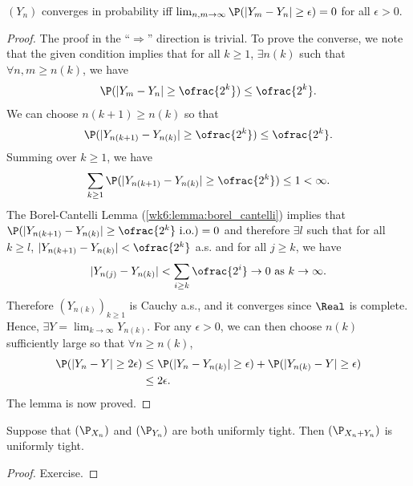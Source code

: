 \documentclass[../aipt.tex]{subfiles}
\begin{document}
\begin{Lemma}\label{wk11:lem:Yconvpiff}
$(Y_n)$ converges in probability iff $\lim_{n,m\to\infty} \P(|Y_m-Y_n|\geq \epsilon) =0$ for all $\epsilon>0$.
\end{Lemma}
\begin{proof}
The proof in the ``$\Rightarrow$'' direction is trivial. To prove the converse, we note that the given condition implies that for all $k\geq1$, $\exists n(k)$ such that $\forall n,m \geq n(k)$, we have
\begin{align*}
\P(|Y_m-Y_n|\geq\ofrac{2^k}) \leq \ofrac{2^k}. 
\end{align*}
We can choose $n(k+1) \geq n(k)$ so that
\begin{align*}
\P(|Y_{n(k+1)}-Y_{n(k)}|\geq\ofrac{2^k}) \leq \ofrac{2^k}. 
\end{align*}
Summing over $k\geq 1$, we have
\begin{align*}
\sum_{k\geq1} \P(|Y_{n(k+1)}-Y_{n(k)}|\geq\ofrac{2^k}) \leq 1 <\infty. 
\end{align*}
The Borel-Cantelli Lemma (\cref{wk6:lemma:borel_cantelli}) implies that $\P(|Y_{n(k+1)}-Y_{n(k)}|\geq\ofrac{2^k} \io)=0$ and therefore $\exists l$ such that for all $k\geq l$, $|Y_{n(k+1)}-Y_{n(k)}|<\ofrac{2^k}$ a.s. and for all $j\geq k$, we have
\begin{align*}
|Y_{n(j)}-Y_{n(k)}|< \sum_{i\geq k} \ofrac{2^i} \to 0 \text{ as $k\to\infty$}.
\end{align*}
Therefore $(Y_{n(k)})_{k\geq1}$ is Cauchy a.s., and it converges since $\Real$ is complete. Hence, $\exists Y = \lim_{k\to\infty} Y_{n(k)}$. For any $\epsilon>0$, we can then choose $n(k)$ sufficiently large so that $\forall n\geq n(k)$,
\begin{align*}
\P(|Y_n-Y|\geq 2\epsilon)
&\leq \P(|Y_n - Y_{n(k)}|\geq\epsilon) + \P(|Y_{n(k)}-Y|\geq\epsilon) \\
&\leq 2\epsilon.
\end{align*}
The lemma is now proved.
\end{proof}

\begin{Lemma}\label{wk11:lem:XYut}
Suppose that $(\P_{X_n})$ and $(\P_{Y_n})$ are both uniformly tight. Then $(\P_{X_n+Y_n})$ is uniformly tight.
\end{Lemma}
\begin{proof}
Exercise.
\end{proof}
\end{document}
